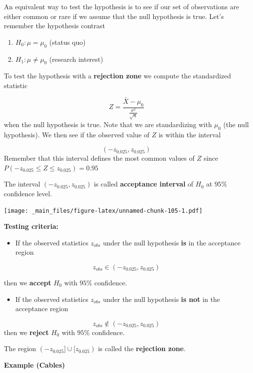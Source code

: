 \documentclass[
]{book}
\providecommand{\tightlist}{%
  \setlength{\itemsep}{0pt}\setlength{\parskip}{0pt}}
\begin{document}
An equivalent way to test the hypothesis is to see if our set of observations are either common or rare if we assume that the null hypothesis is true. Let's remember the hypothesis contrast

\begin{enumerate}
\def\labelenumi{\alph{enumi}.}
\tightlist
\item
  \(H_0:\mu = \mu_0\) (status quo)
\item
  \(H_1:\mu \neq \mu_0\) (research interest)
\end{enumerate}

To test the hypothesis with a \textbf{rejection zone} we compute the standardized statistic

\[Z=\frac{\bar{X}-\mu_0}{\frac{\sigma^2}{\sqrt{n}}}\]
when the null hypothesis is true. Note that we are standardizing with \(\mu_0\) (the null hypothesis). We then see if the observed value of \(Z\) is within the interval

\[(-z_{0.025}, z_{0.025})\]
Remember that this interval defines the most common values of \(Z\) since \(P(-z_{0.025} \leq Z \leq z_{0.025})=0.95\)

The interval \((-z_{0.025}, z_{0.025})\) is called \textbf{acceptance interval} of \(H_0\) at \(95\%\) confidence level.

\texttt{[image: \_main\_files/figure-latex/unnamed-chunk-105-1.pdf]}

\textbf{Testing criteria:}

\begin{itemize}
\tightlist
\item
  If the observed statistics \(z_{obs}\) under the null hypothesis \textbf{is} in the acceptance region
\end{itemize}

\[z_{obs} \in (-z_{0.025}, z_{0.025})\]

then we \textbf{accept} \(H_0\) with \(95\%\) confidence.

\begin{itemize}
\tightlist
\item
  If the observed statistics \(z_{obs}\) under the null hypothesis \textbf{is not} in the acceptance region
\end{itemize}

\[z_{obs} \notin (-z_{0.025}, z_{0.025})\] then we \textbf{reject} \(H_0\) with \(95\%\) confidence.

The region \((-z_{0.025}] \cup[z_{0.025})\) is called the \textbf{rejection zone}.

\textbf{Example (Cables)}
\end{document}
